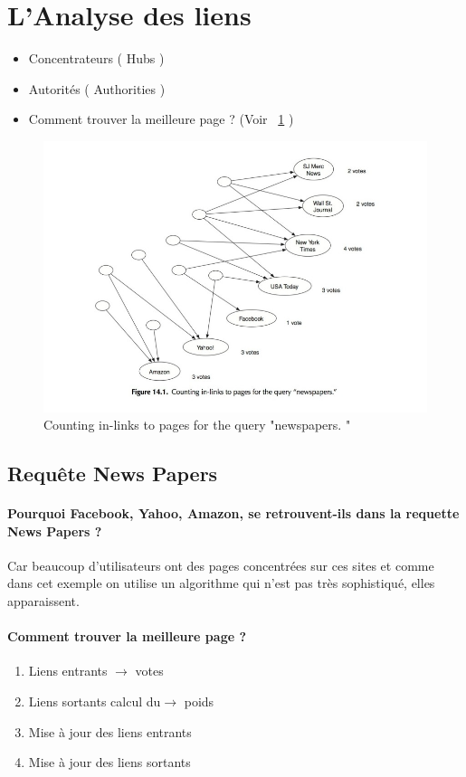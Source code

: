 \section{L’Analyse des liens}
\begin{itemize}
\item Concentrateurs ( Hubs )
\item Autorités ( Authorities )
\item Comment trouver la meilleure page ? (Voir ~\ref{fig-14-1}	)
\end{itemize}



\begin{figure}[!h]
\centering
\includegraphics[scale=0.5]{images/ref/fig-14-1.jpeg}
\caption{Counting in-links to pages for the query "newspapers.	"}
\label{fig-14-1}
\end{figure}

\subsection{Requête News Papers}

\paragraph{Pourquoi Facebook, Yahoo, Amazon, se retrouvent-ils dans la requette News Papers ?}
Car beaucoup d'utilisateurs ont des pages concentrées sur ces sites et comme dans cet exemple on utilise un algorithme qui n'est pas très sophistiqué, elles apparaissent. 

\paragraph{Comment trouver la meilleure page ?}
\begin{enumerate}
\item Liens entrants $ \rightarrow $ votes
\item Liens sortants  calcul du$ \rightarrow$  poids
\item Mise à jour des liens entrants
\item Mise à jour des liens sortants 
\end{enumerate}

